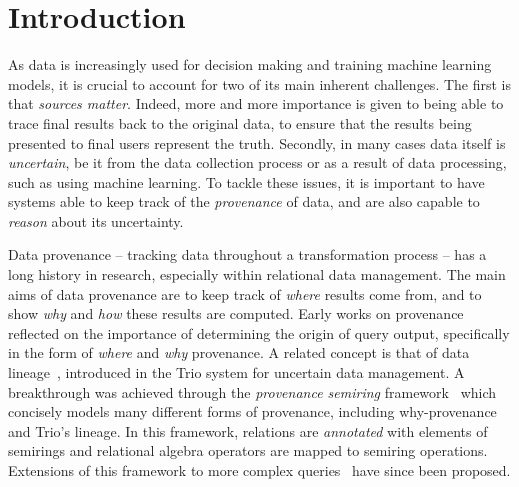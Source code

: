 \section{Introduction}
\label{sec:introduction}

As data is increasingly used for decision making and training machine
learning models, it is crucial to account for two of its main inherent
challenges. The first is that \emph{sources matter}. Indeed, more and
more importance is given to being able to trace final results back to the
original data, to ensure that the results being presented to final users
represent the truth. Secondly, in many cases data itself is
\emph{uncertain}, be it from the data collection process or as a result
of data processing, such as using machine learning. To
tackle these issues, it is important to have systems able to keep track
of the \emph{provenance} of data, and are also capable to \emph{reason} about its uncertainty.

Data provenance -- tracking data throughout a transformation process --
has a long history in research, especially within relational data
management. The main aims of data provenance are to keep track of \emph{where}
results come from, and to show \emph{why} and \emph{how} these results
are computed.
Early works on
provenance~\cite{dblp:conf/fsttcs/bunemankt00,bunemankt01} reflected on
the importance of determining the origin of query output, specifically in
the form of \emph{where} and \emph{why} provenance. A related
concept is that of data lineage~\cite{dblp:conf/vldb/agrawalbshnsw06},
introduced in the Trio system for uncertain data
management. A breakthrough was achieved through the \emph{provenance
	semiring} framework~\cite{green2007provenance} which
concisely models many different forms of provenance, including
why-provenance and Trio's lineage. In this framework, relations are
\emph{annotated} with elements of semirings and relational algebra
operators are mapped to semiring operations. Extensions of this framework
to more complex
queries~\cite{dblp:journals/japll/geertsp10,amsterdamer2011provenance,DBLP:conf/sigmod/BourhisDM20}
have since been proposed.

